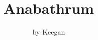 \documentclass[20pt, titlepage, twoside]{extarticle}
\begin{document}
\title{Anabathrum}
\author{by Keegan}
\date{}
\maketitle
\begin{large}
\end{large}
\pagebreak
\begin{multicols}{2}
\begin{footnotesize}
    \noindent %
\end{footnotesize}
\end{multicols}
\end{document}
